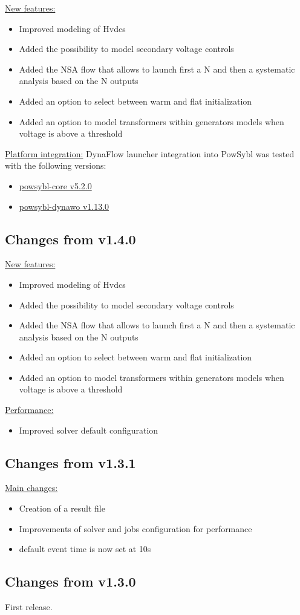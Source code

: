 \documentclass[a4paper, 12pt]{report}
\begin{document}
\underline{New features:}
\begin{itemize}
\item Improved modeling of Hvdcs
\item Added the possibility to model secondary voltage controls
\item Added the NSA flow that allows to launch first a N and then a systematic analysis based on the N outputs
\item Added an option to select between warm and flat initialization
\item Added an option to model transformers within generators models when voltage is above a threshold
\end{itemize}

\underline{Platform integration:}
DynaFlow launcher integration into PowSybl was tested with the following versions:
\begin{itemize}
\item \href{https://github.com/powsybl/powsybl-core/releases/tag/v5.2.0}{powsybl-core v5.2.0}
\item \href{https://github.com/powsybl/powsybl-dynawo/releases/tag/v1.13.0}{powsybl-dynawo v1.13.0}
\end{itemize}

\subsection{Changes from v1.4.0}

\underline{New features:}
\begin{itemize}
\item Improved modeling of Hvdcs
\item Added the possibility to model secondary voltage controls
\item Added the NSA flow that allows to launch first a N and then a systematic analysis based on the N outputs
\item Added an option to select between warm and flat initialization
\item Added an option to model transformers within generators models when voltage is above a threshold
\end{itemize}

\underline{Performance:}
\begin{itemize}
\item Improved solver default configuration
\end{itemize}

\subsection{Changes from v1.3.1}

\underline{Main changes:}
\begin{itemize}
\item Creation of a result file
\item Improvements of solver and jobs configuration for performance
\item default event time is now set at 10s
\end{itemize}


\subsection{Changes from v1.3.0}
First release.
\end{document}
